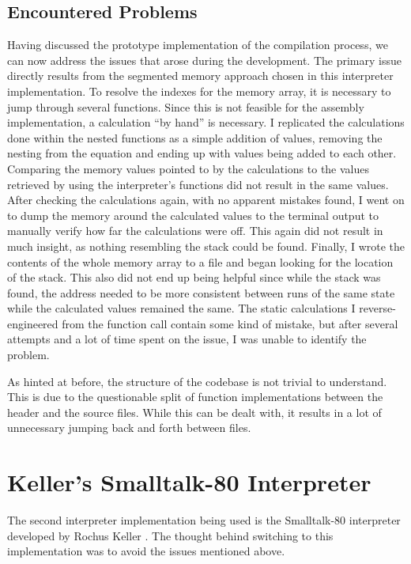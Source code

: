 \subsection{Encountered Problems}
Having discussed the prototype implementation of the compilation process, we can now address the issues that arose during the development.
The primary issue directly results from the segmented memory approach chosen in this interpreter implementation. 
To resolve the indexes for the memory array, it is necessary to jump through several functions. Since this is not feasible for the assembly implementation, a calculation \enquote{by hand} is necessary. 
I replicated the calculations done within the nested functions as a simple addition of values, removing the nesting from the equation and ending up with values being added to each other.
Comparing the memory values pointed to by the calculations to the values retrieved by using the interpreter's functions did not result in the same values. 
After checking the calculations again, with no apparent mistakes found, I went on to dump the memory around the calculated values to the terminal output to manually verify how far the calculations were off. This again did not result in much insight, as nothing resembling the stack could be found.
Finally, I wrote the contents of the whole memory array to a file and began looking for the location of the stack. This also did not end up being helpful since while the stack was found, the address needed to be more consistent between runs of the same state while the calculated values remained the same.
The static calculations I reverse-engineered from the function call contain some kind of mistake, but after several attempts and a lot of time spent on the issue, I was unable to identify the problem.

As hinted at before, the structure of the codebase is not trivial to understand. This is due to the questionable split of function implementations between the header and the source files. While this can be dealt with, it results in a lot of unnecessary jumping back and forth between files.

\section{Keller's Smalltalk-80 Interpreter}
The second interpreter implementation being used is the Smalltalk-80 interpreter developed by Rochus Keller \cite{Keller2021}. The thought behind switching to this implementation was to avoid the issues mentioned above. 

